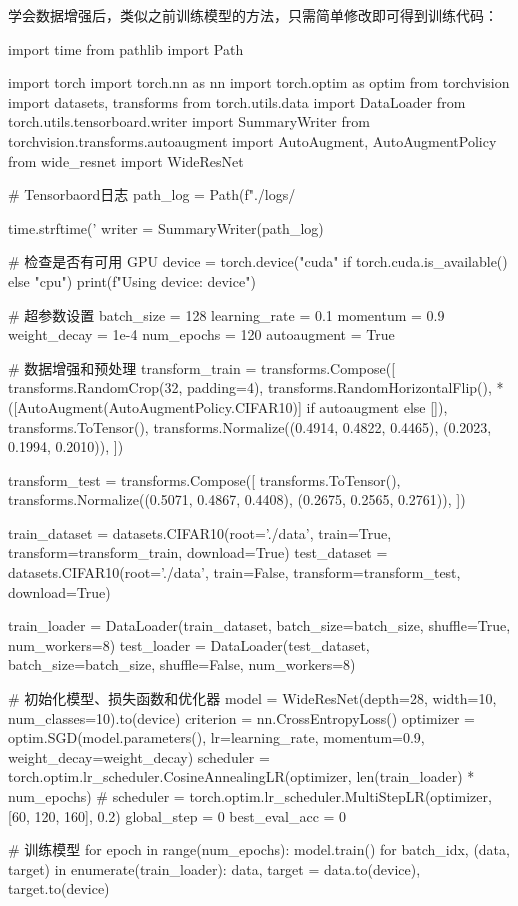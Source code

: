 \documentclass[12pt, a4paper, oneside]{ctexart}
\numberwithin{equation}{section}  %
\begin{document}
学会数据增强后，类似之前训练模型的方法，只需简单修改即可得到训练代码：
\begin{pythoncode}
import time
from pathlib import Path

import torch
import torch.nn as nn
import torch.optim as optim
from torchvision import datasets, transforms
from torch.utils.data import DataLoader
from torch.utils.tensorboard.writer import SummaryWriter
from torchvision.transforms.autoaugment import AutoAugment, AutoAugmentPolicy
from wide_resnet import WideResNet

# Tensorbaord日志
path_log = Path(f"./logs/{time.strftime('%
writer = SummaryWriter(path_log)

# 检查是否有可用 GPU
device = torch.device("cuda" if torch.cuda.is_available() else "cpu")
print(f"Using device: {device}")

# 超参数设置
batch_size = 128
learning_rate = 0.1
momentum = 0.9
weight_decay = 1e-4
num_epochs = 120
autoaugment = True

# 数据增强和预处理
transform_train = transforms.Compose([
  transforms.RandomCrop(32, padding=4),
  transforms.RandomHorizontalFlip(),
  *([AutoAugment(AutoAugmentPolicy.CIFAR10)] if autoaugment else []),
  transforms.ToTensor(),
  transforms.Normalize((0.4914, 0.4822, 0.4465),
                      (0.2023, 0.1994, 0.2010)),
])

transform_test = transforms.Compose([
  transforms.ToTensor(),
  transforms.Normalize((0.5071, 0.4867, 0.4408),
                       (0.2675, 0.2565, 0.2761)),
])

train_dataset = datasets.CIFAR10(root='./data', train=True, transform=transform_train, download=True)
test_dataset = datasets.CIFAR10(root='./data', train=False, transform=transform_test, download=True)

train_loader = DataLoader(train_dataset, batch_size=batch_size, shuffle=True, num_workers=8)
test_loader = DataLoader(test_dataset, batch_size=batch_size, shuffle=False, num_workers=8)

# 初始化模型、损失函数和优化器
model = WideResNet(depth=28, width=10, num_classes=10).to(device)
criterion = nn.CrossEntropyLoss()
optimizer = optim.SGD(model.parameters(), lr=learning_rate, momentum=0.9, weight_decay=weight_decay)
scheduler = torch.optim.lr_scheduler.CosineAnnealingLR(optimizer, len(train_loader) * num_epochs)
# scheduler = torch.optim.lr_scheduler.MultiStepLR(optimizer, [60, 120, 160], 0.2)
global_step = 0
best_eval_acc = 0

# 训练模型
for epoch in range(num_epochs):
  model.train()
  for batch_idx, (data, target) in enumerate(train_loader):
    data, target = data.to(device), target.to(device)

}
\end{pythoncode}
\end{document}

